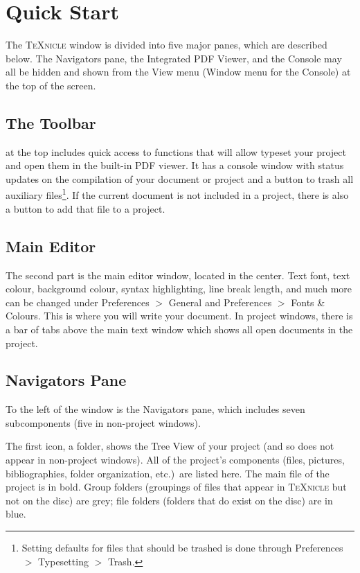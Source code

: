 \documentclass[11pt]{report}
\newcommand{\texnicle}{\textsc{TeXnicle}\xspace}
\begin{document}
\section{Quick Start}
\label{userguide.quickstart}
The \texnicle window is divided into five major panes, which are described below. The Navigators pane, the Integrated PDF Viewer, and the Console may all be hidden and shown from the View menu (Window menu for the Console) at the top of the screen.

\subsection{The Toolbar} at the top includes quick access to functions that will allow typeset your project and open them in the built-in PDF viewer. It has a console window with status updates on the compilation of your document or project and a button to trash all auxiliary files\footnote{Setting defaults for files that should be trashed is done through Preferences $>$ Typesetting $>$ Trash.}. If the current document is not included in a project, there is also a button to add that file to a project.

\subsection{Main Editor}
The second part is the main editor window, located in the center. Text font, text colour, background colour, syntax highlighting, line break length, and much more can be changed under Preferences $>$ General and Preferences $>$ Fonts \& Colours. This is where you will write your document. In project windows, there is a bar of tabs above the main text window which shows all open documents in the project.

\subsection{Navigators Pane}
To the left of the window is the Navigators pane, which includes seven subcomponents (five in non-project windows).

The first icon, a folder, shows the Tree View of your project (and so does not appear in non-project windows). All of the project's components (files, pictures, bibliographies, folder organization, etc.)\ are listed here. The main file of the project is in bold. Group folders (groupings of files that appear in \texnicle but not on the disc) are grey; file folders (folders that do exist on the disc) are in blue.
\end{document}
